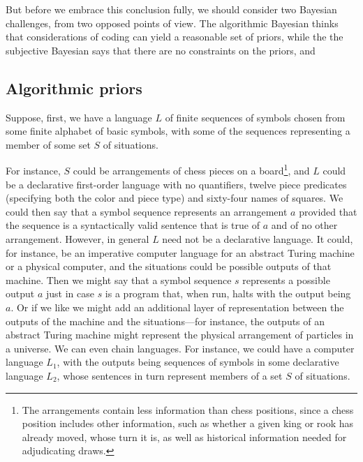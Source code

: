 But before we embrace this conclusion fully, we should consider two Bayesian challenges, from two opposed points of view.
The algorithmic Bayesian thinks that considerations of coding can yield a reasonable set of priors, while the 
the subjective Bayesian says that there are no constraints on the priors, and 

\subsection{Algorithmic priors}
Suppose, first, we have a language $L$ of finite sequences of symbols chosen from some finite alphabet of basic symbols, 
with some of the sequences representing a member of some set $S$ of situations. 

For instance, $S$ could be arrangements of chess pieces on a board\footnote{The arrangements contain less information
than chess positions, since a chess position includes other information, such as whether a given king or rook has already
moved, whose turn it is, as well as historical information needed for adjudicating draws.}, and $L$ could be a declarative 
first-order language with no quantifiers, twelve piece predicates (specifying both the color and piece type) and sixty-four names of squares.
We could then say that a symbol sequence represents an arrangement $a$ provided that the sequence is a 
syntactically valid sentence that is true of $a$ and of no other arrangement. However, in general $L$ need not be a declarative
language. It could, for instance, be an imperative computer language for an abstract Turing machine or a physical computer,
and the situations could be possible outputs of that machine. Then we might say that a symbol sequence $s$ represents
a possible output $a$ just in case $s$ is a program that, when run, halts with the output being $a$. Or if we like we might 
add an additional layer of representation between the outputs of the machine and the situations---for instance, the outputs
of an abstract Turing machine might represent the physical arrangement of particles in a universe.  
We can even chain languages. For instance, we could have a computer language $L_1$, with the outputs being sequences of
symbols in some declarative language $L_2$, whose sentences in turn represent members of a set $S$ of situations.

